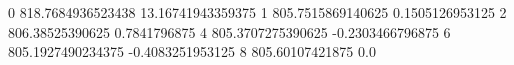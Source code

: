 0 818.7684936523438 13.16741943359375
1 805.7515869140625 0.1505126953125
2 806.38525390625 0.7841796875
4 805.3707275390625 -0.2303466796875
6 805.1927490234375 -0.4083251953125
8 805.60107421875 0.0
